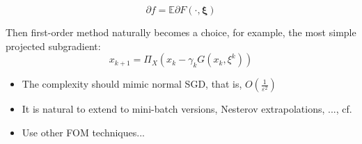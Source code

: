 \documentclass[a4pper,10pt]{article}
\newcommand{\ex}{\mathbb E}
\begin{document}
$$\partial f = \ex \partial F(\cdot, \bm \xi)$$

Then first-order method naturally becomes a choice, for example, the most simple projected subgradient:
$$x_{k+1}=\Pi_{X}\left(x_{k}-\gamma_{k} G\left(x_{k}, \xi^{k}\right)\right)$$
\begin{itemize}
	\item The complexity should mimic normal SGD, that is, $O\left(\frac{1}{\varepsilon^2}\right)$
	\item It is natural to extend to mini-batch versions, Nesterov extrapolations, ..., cf. \citet{ghadimi_optimal_2012,ghadimi_optimal_2013,ghadimi_stochastic_2013,ghadimi_accelerated_2016,ghadimi_mini-batch_2016}
	\item Use other FOM techniques...
\end{itemize}





\end{document}
